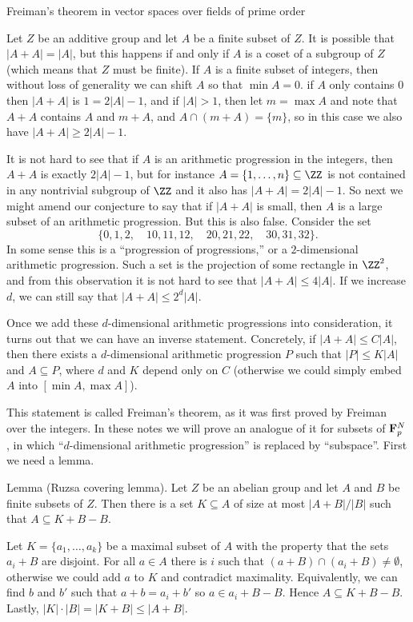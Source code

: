 \advsect Freiman's theorem in vector spaces over fields of prime order

Let $Z$ be an additive group and let $A$ be a finite subset of $Z$. It is possible that $|A+A| = |A|$,
but this happens if and only if $A$ is a coset of a subgroup of $Z$ (which means that $Z$ must be finite).
If $A$ is a finite subset of integers, then without loss of generality we can shift $A$ so that $\min A = 0$.
if $A$ only contains $0$ then $|A+A|$ is $1 = 2|A|-1$, and if $|A| > 1$, then let $m = \max A$ and
note that $A+A$ contains $A$ and $m+A$, and $A\cap (m+A) = \{m\}$, so in this case we also have $|A+A|\ge 2|A|-1$.

It is not hard to see that if $A$ is an arithmetic progression
in the integers, then $A+A$ is exactly $2|A|-1$,
but for instance $A = \{1,\ldots,n\}\subseteq \ZZ$ is not contained in any nontrivial subgroup of $\ZZ$ and
it also has $|A+A| = 2|A|-1$.
So next we might amend our conjecture to say that if $|A+A|$ is small, then $A$ is a large subset of an arithmetic
progression. But this is also false. Consider the set
$$\{0,1,2,\quad 10,11,12,\quad 20,21,22,\quad 30,31,32\}.$$
In some sense this is a ``progression of progressions,'' or a $2$-dimensional arithmetic progression. Such
a set is the projection of some rectangle in $\ZZ^2$, and from this observation it is not hard to see
that $|A+A|\le 4|A|$. If we increase $d$, we can still say that $|A+A|\le 2^d|A|$.

Once we add these $d$-dimensional arithmetic progressions into consideration, it turns out that we can have
an inverse statement. Concretely, if $|A+A|\le C|A|$, then there exists a $d$-dimensional arithmetic
progression $P$ such that $|P|\le K|A|$ and $A\subseteq P$, where $d$ and $K$ depend only on $C$ (otherwise
we could simply embed $A$ into $[\min A, \max A]$).

This statement is called Freiman's theorem, as it was first proved by Freiman over the integers.
In these notes we will prove an analogue of it for subsets of ${\bf F}_p^N$, in which ``$d$-dimensional arithmetic
progression'' is replaced by ``subspace''. First we need a lemma.


\parenproclaim Lemma {\advthm} (Ruzsa covering lemma). Let $Z$ be an abelian group and let $A$ and
$B$ be finite subsets of $Z$. Then there is a set $K\subseteq A$ of size at most $|A+B|/|B|$ such that
$A\subseteq K+B-B$.

\proof Let $K = \{a_1,\ldots,a_k\}$ be a maximal subset of $A$ with the property that the sets $a_i+B$
are disjoint. For all $a\in A$ there is $i$ such that $(a+B) \cap (a_i+B) \ne \emptyset$, otherwise we
could add $a$ to $K$ and contradict maximality. Equivalently, we can find $b$ and $b'$ such that
$a+b = a_i + b'$ so $a\in a_i + B - B$. Hence $A\subseteq K+B-B$. Lastly, $|K|\cdot |B| = |K+B| \le |A+B|$.\slug

